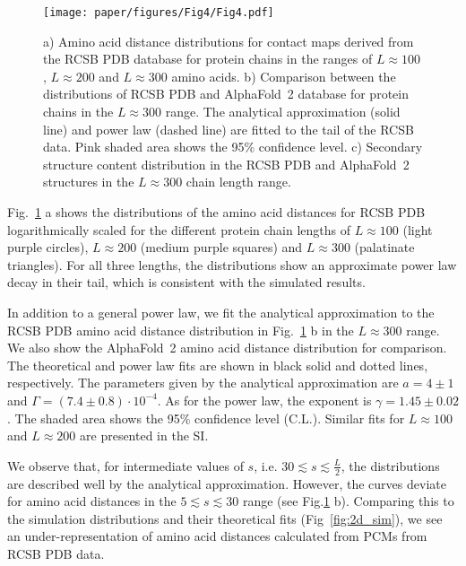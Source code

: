 \documentclass[
reprint,
twocolumn,
amsmath,amssymb,superscriptaddress,aps,
pre]{revtex4-1}
\begin{document}
\begin{figure}[htb]
        \centering
	\texttt{[image: paper/figures/Fig4/Fig4.pdf]}
        \caption{a) Amino acid distance distributions for contact maps derived from the RCSB PDB database for protein chains in the ranges of $L\approx100$, $L\approx200$ and $L\approx300$ amino acids. b) Comparison between the distributions of RCSB PDB and AlphaFold~2 database for protein chains in the $L\approx300$ range. The analytical approximation (solid line) and power law (dashed line) are fitted to the tail of the RCSB data. Pink shaded area shows the 95\% confidence level. c) Secondary structure content distribution in the RCSB PDB and AlphaFold~2 structures in the $L\approx300$ chain length range.}
        \label{fig:sdd}
\end{figure}

Fig.~\ref{fig:sdd} a shows the distributions of the amino acid distances for RCSB PDB logarithmically scaled for the different protein chain lengths of $L\approx100$ (light purple circles), $L\approx200$ (medium purple squares) and $L\approx300$ (palatinate triangles). For all three lengths, the distributions show an approximate power law decay in their tail, which is consistent with the simulated results. 

In addition to a general power law, we fit the analytical approximation to the RCSB PDB amino acid distance distribution in Fig.~\ref{fig:sdd} b in the $L\approx300$ range. We also show the AlphaFold~2 amino acid distance distribution for comparison. The theoretical and power law fits are shown in black solid and dotted lines, respectively. The parameters given by the analytical approximation are $a=4 \pm 1$ and $\Gamma=(7.4 \pm 0.8)\cdot 10^{-4}$. As for the power law, the exponent is $\gamma=1.45 \pm 0.02$. The shaded area shows the 95\% confidence level (C.L.). Similar fits for $L\approx100$ and $L\approx200$ are presented in the SI.


We observe that, for intermediate values of $s$, i.e. $30\lesssim s\lesssim \frac{L}{2}$, the distributions are described well by the analytical approximation. However, the curves deviate for amino acid distances in the $5\lesssim s \lesssim 30$ range (see Fig.\ref{fig:sdd} b). Comparing this to the simulation distributions and their theoretical fits (Fig~\ref{fig:2d_sim}), we see an under-representation of amino acid distances calculated from PCMs from RCSB PDB data. 
\end{document}

